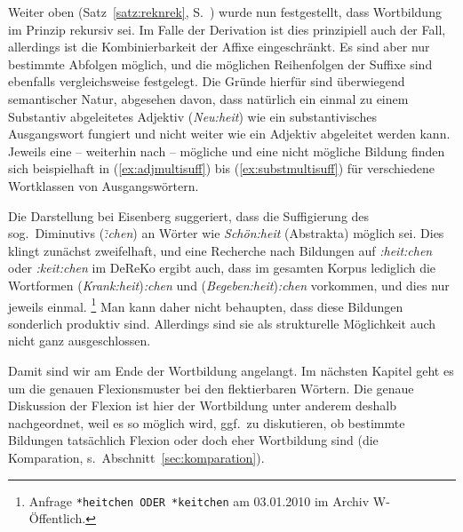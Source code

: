 Weiter oben (Satz~\ref{satz:reknrek}, S.~\pageref{satz:reknrek}) wurde nun festgestellt, dass Wortbildung im Prinzip rekursiv sei.
Im Falle der Derivation ist dies prinzipiell auch der Fall, allerdings ist die Kombinierbarkeit der Affixe eingeschränkt.
Es sind aber nur bestimmte Abfolgen möglich, und die möglichen Reihenfolgen der Suffixe sind ebenfalls vergleichsweise festgelegt.
Die Gründe hierfür sind überwiegend semantischer Natur, abgesehen davon, dass natürlich \zB ein einmal zu einem Substantiv abgeleitetes Adjektiv (\textit{Neu:heit}) wie ein substantivisches Ausgangswort fungiert und nicht weiter wie ein Adjektiv abgeleitet werden kann.
Jeweils eine -- weiterhin nach \citealp{Eisenberg1} -- mögliche und eine nicht mögliche Bildung finden sich beispielhaft in (\ref{ex:adjmultisuff}) bis (\ref{ex:substmultisuff}) für verschiedene Wortklassen von Ausgangswörtern.

\begin{exe}
\end{exe}


Die Darstellung bei Eisenberg suggeriert, dass die Suffigierung des sog.\ Diminutivs (\textit{\~:chen}) an Wörter wie \textit{Schön:heit} (Abstrakta) möglich sei.
Dies klingt zunächst zweifelhaft, und eine Recherche nach Bildungen auf \textit{:heit:chen} oder \textit{:keit:chen} im DeReKo ergibt auch, dass im gesamten Korpus lediglich die Wortformen (\textit{Krank:heit})\textit{:chen} und (\textit{Begeben:heit})\textit{:chen} vorkommen, und dies nur jeweils einmal.%
\footnote{Anfrage \texttt{*heitchen ODER *keitchen} am 03.01.2010 im Archiv W-Öffentlich.}
Man kann daher nicht behaupten, dass diese Bildungen sonderlich produktiv sind.
Allerdings sind sie als strukturelle Möglichkeit auch nicht ganz ausgeschlossen.

Damit sind wir am Ende der Wortbildung angelangt.
Im nächsten Kapitel geht es um die genauen Flexionsmuster bei den flektierbaren Wörtern.
Die genaue Diskussion der Flexion ist hier der Wortbildung unter anderem deshalb nachgeordnet, weil es so möglich wird, ggf.\ zu diskutieren, ob bestimmte Bildungen tatsächlich Flexion oder doch eher Wortbildung sind (\zB die Komparation, s.\ Abschnitt~\ref{sec:komparation}).

